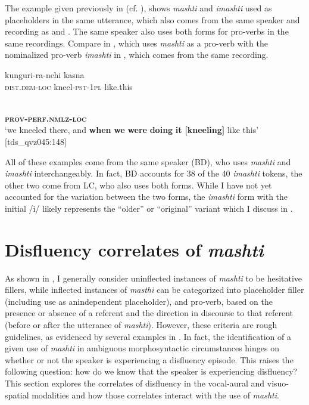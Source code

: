 \documentclass[output=paper]{langscibook}
\begin{document}
The example given previously in  (cf. ), shows \textit{mashti} and \textit{imashti} used as placeholders in the same utterance, which also comes from the same speaker and recording as  and . The same speaker also uses both forms for pro-verbs in the same recordings. Compare  in , which uses \textit{mashti} as a pro-verb with the nominalized pro-verb \textit{imashti} in , which comes from the same recording.

\ea%
\label{ex:rice:19}
 {kunguri-ra-nchi}  {kasna} \\
\textsc{dist.dem-loc}  {kneel-\textsc{pst-1pl}} {like.this} \\
\medskip

\\
\textbf{\textsc{prov-perf.nmlz-loc}}\\
\glt ‘we kneeled there, and \textbf{when} \textbf{we} \textbf{were} \textbf{doing} \textbf{it} \textbf{[kneeling]} like this’ [tds\_qvz045:148]
\z


All of these examples come from the same speaker (BD), who uses \textit{mashti} and \textit{imashti} interchangeably. In fact, BD accounts for 38 of the 40 \textit{imashti} tokens, the other two come from LC, who also uses both forms. While I have not yet accounted for the variation between the two forms, the \textit{imashti} form with the initial /i/ likely represents the “older” or “original” variant which I discuss in .

\section{Disfluency correlates of \textit{mashti}}
\label{sec:rice:4}
As shown in , I generally consider uninflected instances of \textit{mashti} to be hesitative fillers, while inflected instances of \textit{masthi} can be categorized into placeholder filler (including use as anindependent placeholder), and pro-verb, based on the presence or absence of a referent and the direction in discourse to that referent (before or after the utterance of \textit{mashti}). However, these criteria are rough guidelines, as evidenced by several examples in . In fact, the identification of a given use of \textit{mashti} in ambiguous morphosyntactic circumstances hinges on whether or not the speaker is experiencing a disfluency episode. This raises the following question: how do we know that the speaker is experiencing disfluency? This section explores the correlates of disfluency in the vocal-aural and visuo-spatial modalities and how those correlates interact with the use of \textit{mashti}.
\end{document}
